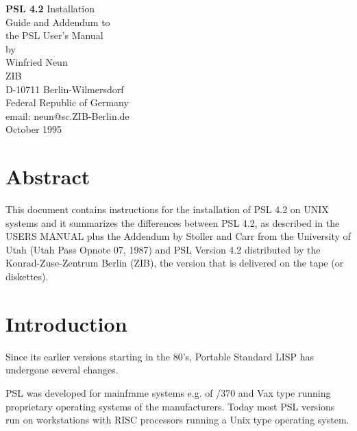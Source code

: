 \date{}
\sloppy

\parindent 0pt
\parskip 6pt
\pagestyle{empty}
\setlength{\topsep}{0.5\baselineskip}  %
\setlength{\itemsep}{\topsep}
\setlength{\abovedisplayskip}{\topsep}  %
\setlength{\belowdisplayskip}{\topsep}

\renewcommand{\arraystretch}{1.3}


\pagestyle{empty}
\begin{titlepage}
   \dotitlepage
\end{titlepage}

\vspace*{1cm}
\begin{center}
\VERYLARGE
{\bf PSL 4.2} Installation \\
Guide and Addendum to\\
the PSL User's Manual\\
\normalsize
\vspace*{.5cm}
{\large by} \\[0.3cm]
{\Large Winfried Neun}\\
{\large ZIB} \\
{\large D-10711 Berlin-Wilmersdorf} \\[0.3cm]
{\large Federal Republic of Germany} \\[0.5cm]
{\large email: neun@sc.ZIB-Berlin.de} \\[0.3cm]
{\large October 1995}\\[0.5cm]
\vfill
\newpage
\end{center}
\section{Abstract}
This document
contains instructions for the installation of PSL 4.2 on UNIX systems 
and it summarizes the differences between PSL 4.2, as
described in the USERS MANUAL plus the Addendum by Stoller and Carr
from the University of Utah (Utah Pass Opnote 07, 1987)
and PSL Version 4.2 distributed by the
Konrad-Zuse-Zentrum Berlin (ZIB), the version that
is delivered on the tape (or diskettes).  

\section{Introduction}

Since its earlier versions starting in the 80's, Portable Standard LISP 
has undergone several changes. 

PSL was developed for mainframe systems
e.g. of /370 and Vax type running proprietary operating systems of the  
manufacturers. Today most PSL versions run on workstations with RISC processors
running a Unix type operating system. 

